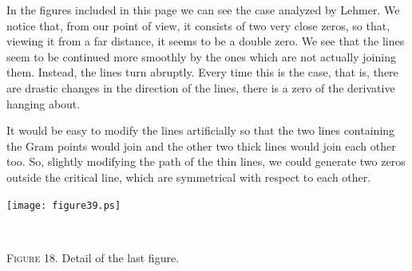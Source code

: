 \documentclass[a4paper]{amsart}
\numberwithin{equation}{section}
\begin{document}
\begin{large}

\vfil\eject

In the figures included in this page we can see the case analyzed by Lehmer. We
notice that, from our point of view, it consists of two very close zeros, so
that, viewing it from a far distance, it seems to be a double zero. We see that
the lines seem to be continued more smoothly by the ones which are not actually
joining them. Instead, the lines turn abruptly. Every time this is the case,
that is, there are drastic changes in the direction of the lines, there is a
zero of the derivative hanging about. 

It would be easy to modify the lines
artificially so that the two lines containing the Gram points would join and
the other two thick lines would join each other too. So, slightly modifying the
path of the thin lines, we could generate two zeros outside the critical line,
which are symmetrical with respect to each other.






\end{large}

\begin{minipage}{325pt}
\bigskip
\texttt{[image: figure39.ps]}
\centerline{\ }
\centerline{{\scshape Figure} 18. Detail of the last figure.}
\end{minipage}
\end{document}
